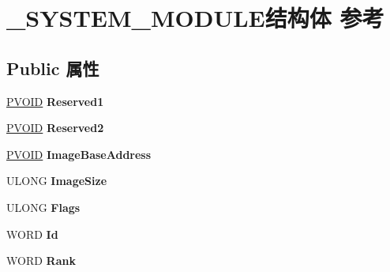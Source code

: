 \hypertarget{struct___s_y_s_t_e_m___m_o_d_u_l_e}{}\section{\+\_\+\+S\+Y\+S\+T\+E\+M\+\_\+\+M\+O\+D\+U\+L\+E结构体 参考}
\label{struct___s_y_s_t_e_m___m_o_d_u_l_e}
\subsection*{Public 属性}
\begin{DoxyCompactItemize}
\item 
\mbox{\label{struct___s_y_s_t_e_m___m_o_d_u_l_e_a53cc5bb0fc85aacd8fb7e6c8cb79b001}} 
\hyperlink{interfacevoid}{P\+V\+O\+ID} {\bfseries Reserved1}
\item 
\mbox{\label{struct___s_y_s_t_e_m___m_o_d_u_l_e_a16252ae0f9bd89aa591c72517d8ca6b3}} 
\hyperlink{interfacevoid}{P\+V\+O\+ID} {\bfseries Reserved2}
\item 
\mbox{\label{struct___s_y_s_t_e_m___m_o_d_u_l_e_a45071b485b1b51374cf7ad4298aab446}} 
\hyperlink{interfacevoid}{P\+V\+O\+ID} {\bfseries Image\+Base\+Address}
\item 
\mbox{\label{struct___s_y_s_t_e_m___m_o_d_u_l_e_a10507e4e6145a651f4798814e54c03e5}} 
U\+L\+O\+NG {\bfseries Image\+Size}
\item 
\mbox{\label{struct___s_y_s_t_e_m___m_o_d_u_l_e_a95c79e17a3a8ca6d75a175828cc7e360}} 
U\+L\+O\+NG {\bfseries Flags}
\item 
\mbox{\label{struct___s_y_s_t_e_m___m_o_d_u_l_e_af8f4012d5915f778179d9cbe1884f1ac}} 
W\+O\+RD {\bfseries Id}
\item 
\mbox{\label{struct___s_y_s_t_e_m___m_o_d_u_l_e_aa1a4be38c36d2a81be768209c6a5375c}} 
W\+O\+RD {\bfseries Rank}
\item 
\mbox{\label{struct___s_y_s_t_e_m___m_o_d_u_l_e_a9fc2525be152400ca8eeffcb4f13198f}} 

\end{DoxyCompactItemize}
